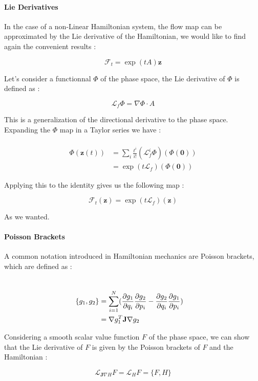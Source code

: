 \documentclass[ansiapaper]{report}
\begin{document}
\begin{multicols}{3}
  \paragraph*{Lie Derivatives}

  In the case of a non-Linear Hamiltonian system, the flow map can be approximated by the Lie derivative of the Hamiltonian, we would like to find again the convenient results :

  $$ \mathcal{F}_t = \exp(tA)\textbf{z}$$

  Let's consider a functionnal $\Phi$ of the phase space, the Lie derivative of $\Phi$ is defined as :

  $$ \mathcal{L}_f \Phi = \nabla \Phi \cdot A$$

  This is a generalization of the directional derivative to the phase space. Expanding the $\Phi$ map in a Taylor series we have :

  \begin{align*}
    \\ \Phi(\textbf{z}(t)) &= \sum_i \frac{t^i}{i!}(\mathcal{L}_f^i \Phi)( \Phi(\textbf{0} ))
    \\ &= \exp(t\mathcal{L}_f)(\Phi(\textbf{0}) )
  \end{align*}

  Applying this to the identity gives us the following map :

  $$\mathcal{F}_t(\textbf{z} ) = \exp(t\mathcal{L}_f)(\textbf{z})$$

  As we wanted.

  \paragraph*{Poisson Brackets}

  A common notation introduced in Hamiltonian mechanics are Poisson brackets, which are defined as :

  \begin{align*}
    \\ \{g_1, g_2 \} &= \sum_{i = 1}^N (\pdv{g_1}{q_i}\pdv{g_2}{p_i} - \pdv{g_2}{q_i}\pdv{g_1}{p_i})
    \\ &= \nabla g_1^T \textbf{J} \nabla g_2
  \end{align*}

  Considering a smooth scalar value function $F$ of the phase space, we can show that the Lie derivative of $F$ is given by the Poisson brackets of $F$ and the Hamiltonian :

  $$ \mathcal{L}_{\textbf{J} \nabla H} F = \mathcal{L}_H F = \{F, H\}$$


\end{multicols}
\end{document}
